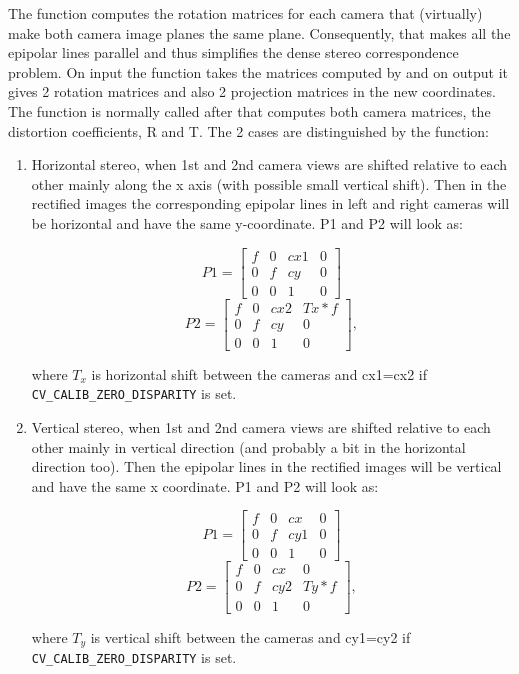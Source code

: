The function computes the rotation matrices for each camera that (virtually) make both camera image planes the same plane. Consequently, that makes all the epipolar lines parallel and thus simplifies the dense stereo correspondence problem. On input the function takes the matrices computed by  and on output it gives 2 rotation matrices and also 2 projection matrices in the new coordinates. The function is normally called after  that computes both camera matrices, the distortion coefficients, R and T. The 2 cases are distinguished by the function: 

\begin{enumerate}
\item Horizontal stereo, when 1st and 2nd camera views are shifted relative to each other mainly along the x axis (with possible small vertical shift). Then in the rectified images the corresponding epipolar lines in left and right cameras will be horizontal and have the same y-coordinate. P1 and P2 will look as: 

\[
P1=
\begin{bmatrix}
f & 0 & cx1 & 0\\
0 & f & cy & 0\\
0 & 0 & 1 & 0
\end{bmatrix}
\]
\[
P2=
\begin{bmatrix}
f & 0 & cx2 & Tx*f\\
0 & f & cy & 0\\
0 & 0 & 1 & 0
\end{bmatrix}
,
\]

where $T_x$ is horizontal shift between the cameras and cx1=cx2 if \texttt{CV\_CALIB\_ZERO\_DISPARITY} is set.
\item Vertical stereo, when 1st and 2nd camera views are shifted relative to each other mainly in vertical direction (and probably a bit in the horizontal direction too). Then the epipolar lines in the rectified images will be vertical and have the same x coordinate. P1 and P2 will look as:

\[
P1=
\begin{bmatrix}
f & 0 & cx & 0\\
0 & f & cy1 & 0\\
0 & 0 & 1 & 0
\end{bmatrix}
\]
\[
P2=
\begin{bmatrix}
f & 0 & cx & 0\\
0 & f & cy2 & Ty*f\\
0 & 0 & 1 & 0
\end{bmatrix}
,
\]

where $T_y$ is vertical shift between the cameras and cy1=cy2 if \texttt{CV\_CALIB\_ZERO\_DISPARITY} is set.
\end{enumerate} 


